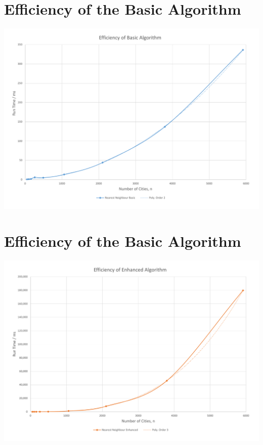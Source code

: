 \documentclass[conference,backref=page]{acmsiggraph}
\begin{document}
\begin{appendices}
	\section{Efficiency of the Basic Algorithm}
		\label{efficiencybasicgraph}
		\includegraphics[width=\textwidth]{images/efficiency_basic.pdf}
	\clearpage
	\section{Efficiency of the Basic Algorithm}
		\label{efficiencyenhancedgraph}
		\includegraphics[width=\textwidth]{images/efficiency_enhanced.pdf}
	\clearpage

\end{appendices}
\end{document}
